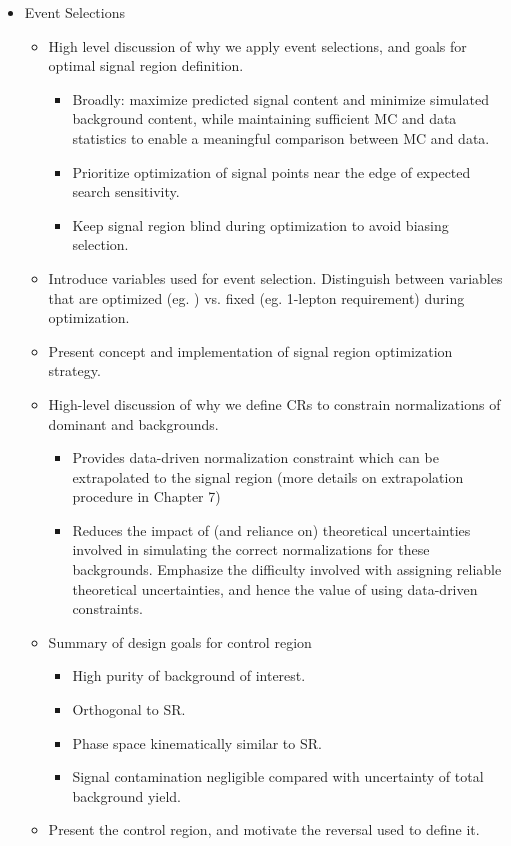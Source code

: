 \begin{itemize}
\item Event Selections
\begin{itemize}
\item High level discussion of why we apply event selections, and goals for optimal signal region definition.
\begin{itemize}
\item Broadly: maximize predicted signal content and minimize simulated background content, while maintaining sufficient MC and data statistics to enable a meaningful comparison between MC and data.
\item Prioritize optimization of signal points near the edge of expected search sensitivity. 
\item Keep signal region blind during optimization to avoid biasing selection.
\end{itemize}
\item Introduce variables used for event selection. Distinguish between variables that are optimized (eg. \mtlepmet) vs. fixed (eg. 1-lepton requirement) during optimization.
\item Present concept and implementation of signal region optimization strategy.
\item High-level discussion of why we define CRs to constrain normalizations of dominant \wjets and \ttbar backgrounds.
\begin{itemize}
\item Provides data-driven normalization constraint which can be extrapolated to the signal region (more details on extrapolation procedure in Chapter 7)
\item Reduces the impact of (and reliance on) theoretical uncertainties involved in simulating the correct normalizations for these backgrounds. Emphasize the difficulty involved with assigning reliable theoretical uncertainties, and hence the value of using data-driven constraints.
\end{itemize}
\item Summary of design goals for control region
\begin{itemize}
\item High purity of background of interest.
\item Orthogonal to SR.
\item Phase space kinematically similar to SR.
\item Signal contamination negligible compared with uncertainty of total background yield.
\end{itemize}
\item Present the \wjets control region, and motivate the \dR reversal used to define it.

\end{itemize}
\end{itemize}
